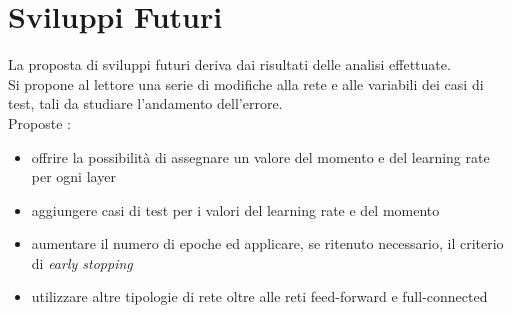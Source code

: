 \chapter{Sviluppi Futuri}
La proposta di sviluppi futuri deriva dai risultati delle analisi effettuate.\\
Si propone al lettore una serie di modifiche alla rete e alle variabili dei casi di test, tali da studiare l'andamento dell'errore.\\
Proposte :
\begin{itemize}
    \item offrire la possibilità di assegnare un valore del momento e del learning rate per ogni layer
    \item aggiungere casi di test per i valori del learning rate e del momento
    \item aumentare il numero di epoche ed applicare, se ritenuto necessario, il criterio di \textit{early stopping}
    \item utilizzare altre tipologie di rete oltre alle reti feed-forward e full-connected
\end{itemize}